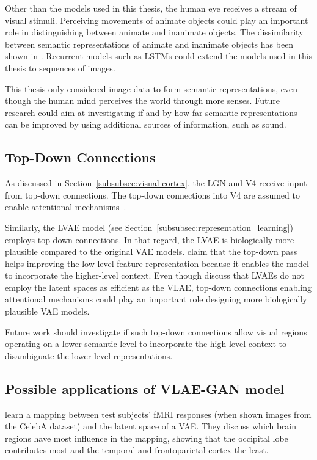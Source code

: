 Other than the models used in this thesis, the human eye receives a stream of visual stimuli.
Perceiving movements of animate objects could play an important role in distinguishing between animate and inanimate objects.
The dissimilarity between semantic representations of animate and inanimate objects has been shown in \citet{khaligh2014deep}.
Recurrent models such as LSTMs could extend the models used in this thesis to sequences of images.

This thesis only considered image data to form semantic representations, even though the human mind perceives the world through more senses.
Future research could aim at investigating if and by how far semantic representations can be improved by using additional sources of information, such as sound.

\subsection{Top-Down Connections}\label{subsec:feedback-connections-of-the-lateral-geniculate-nucleus}
As discussed in Section~\ref{subsubsec:visual-cortex}, the \ac{LGN} and \ac{V4} receive input from top-down connections.
The top-down connections into \ac{V4} are assumed to enable attentional mechanisms~\citep{roe2012toward}.

Similarly, the \ac{LVAE} model (see Section~\ref{subsubsec:representation_learning}) employs top-down connections.
In that regard, the \ac{LVAE} is biologically more plausible compared to the original \ac{VAE} models.
\citet{sonderby2016ladder} claim that the top-down pass helps improving the low-level feature representation because it enables the model to incorporate the higher-level context.
Even though \citet{zhao2017learning} discuss that \acp{LVAE} do not employ the latent spaces as efficient as the \ac{VLAE}, top-down connections enabling attentional mechanisms could play an important role designing more biologically plausible \ac{VAE} models.

Future work should investigate if such top-down connections allow visual regions operating on a lower semantic level to incorporate the high-level context to disambiguate the lower-level representations.

\subsection{Possible applications of VLAE-GAN model}\label{subsec:possible-applications-of-vlae-gan-model}
\citet{vanrullen2019reconstructing} learn a mapping between test subjects' fMRI responses (when shown images from the CelebA dataset) and the latent space of a \ac{VAE}.
They discuss which brain regions have most influence in the mapping, showing that the occipital lobe contributes most and the temporal and frontoparietal cortex the least.

